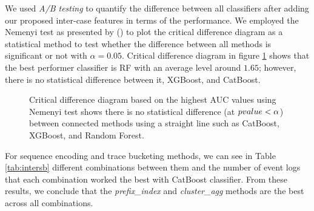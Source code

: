 We used \textit{A/B testing} to quantify the difference between all classifiers after adding our proposed inter-case features in terms of the performance. We employed the Nemenyi test as presented by (\cite{demvsar2006statistical}) to plot the critical difference diagram as a statistical method to test whether the difference between all methods is significant or not with $\alpha = 0.05$. Critical difference diagram in figure \ref{fig:intercd} shows that the best performer classifier is RF with an average level around $1.65$; however, there is no statistical difference between it, XGBoost, and CatBoost.

\begin{figure}[!htb]
	\begin{center}
		\caption[Comparison of all classification algorithms using the Nemenyi test]{Critical difference diagram based on the highest AUC values using Nemenyi test shows there is no statistical difference (at $p\-value < \alpha$) between connected methods using a straight line such as CatBoost, XGBoost, and Random Forest.}
		\label{fig:intercd}
	\end{center}
\end{figure}


For sequence encoding and trace bucketing methods, we can see in Table \ref{tab:intersb} different combinations between them and the number of event logs that each combination worked the best with CatBoost classifier. From these results, we conclude that the \textit{prefix\_index} and \textit{cluster\_agg} methods are the best across all combinations.

